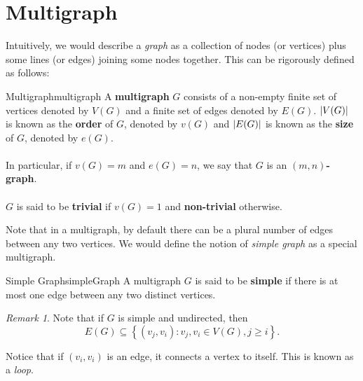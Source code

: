 \documentclass[math]{amznotes}
\theoremstyle{remark}
\newtheorem*{remark}{Remark}
\begin{document}
\section{Multigraph}
Intuitively, we would describe a \textit{graph} as a collection of nodes (or vertices) plus some lines (or edges) joining some nodes together. This can be rigorously defined as follows:
\begin{dfnbox}{Multigraph}{multigraph}
    A {\color{red} \textbf{multigraph}} $G$ consists of a non-empty finite set of vertices denoted by $V(G)$ and a finite set of edges denoted by $E(G)$. ${\left\lvert {V(G)} \right\rvert}$ is known as the {\color{red} \textbf{order}} of $G$, denoted by $v(G)$ and ${\left\lvert {E(G)} \right\rvert}$ is known as the {\color{red} \textbf{size}} of $G$, denoted by $e(G)$.
    \\\\
    In particular, if $v(G) = m$ and $e(G) = n$, we say that $G$ is an {\color{red} \textbf{$(m, n)$-graph}}.
    \\\\
    $G$ is said to be {\color{red} \textbf{trivial}} if $v(G) = 1$ and {\color{red} \textbf{non-trivial}} otherwise.
\end{dfnbox}
Note that in a multigraph, by default there can be a plural number of edges between any two vertices. We would define the notion of \textit{simple graph} as a special multigraph.
\begin{dfnbox}{Simple Graph}{simpleGraph}
    A multigraph $G$ is said to be {\color{red} \textbf{simple}} if there is at most one edge between any two distinct vertices.
\end{dfnbox}
\begin{notebox}
    \begin{remark}
        Note that if $G$ is simple and undirected, then
        \begin{displaymath}
            E(G) \subseteq \left\{(v_j, v_i) \colon v_j, v_i \in V(G), j \geq i\right\}.
        \end{displaymath}
    \end{remark}
\end{notebox}
Notice that if $(v_i, v_i)$ is an edge, it connects a vertex to itself. This is known as a \textit{loop}.
\end{document}
